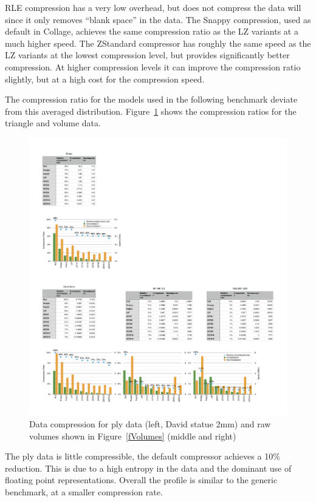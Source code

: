 \documentclass[10pt,journal,compsoc]{IEEEtran}
\newcommand{\fig}[1]{Figure~\ref{#1}}
\begin{document}
RLE compression has a very low overhead, but does not compress the data will
since it only removes ``blank space'' in the data. The Snappy compression, used
as default in Collage, achieves the same compression ratio as the LZ variants at
a much higher speed. The ZStandard compressor has roughly the same speed as the
LZ variants at the lowest compression level, but provides significantly better
compression. At higher compression levels it can improve the compression ratio
slightly, but at a high cost for the compression speed.

The compression ratio for the models used in the following benchmark deviate
from this averaged distribution. \fig{fCompressorDetail} shows the compression
ratios for the triangle and volume data.

\begin{figure}[ht]\center
  \includegraphics[width=\textwidth]{images/compressorDetail}
  \caption{\label{fCompressorDetail}Data compression for ply data (left, David
    statue 2mm) and raw volumes shown in \fig{fVolumes} (middle and right)}
\end{figure}

The ply data is little compressible, the default compressor achieves a 10\%
reduction. This is due to a high entropy in the data and the dominant use of
floating point representations. Overall the profile is similar to the generic
benchmark, at a smaller compression rate.
\end{document}
